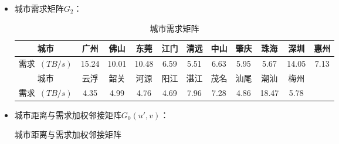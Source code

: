 \documentclass[UTF8,12pt]{ctexart}
\begin{document}
\begin{enumerate}
\begin{itemize}
              \item 城市需求矩阵$G_2$：
                    \begin{table}[htbp]
                        \centering
                        \caption{城市需求矩阵}
                        \begin{tabular}{ccccccccccc}
                            \toprule
                            城市 & 广州  & 佛山  & 东莞  & 江门 & 清远 & 中山 & 肇庆 & 珠海  & 深圳  & 惠州 \\
                            \midrule
                            需求\, $(TB/s)$ & 15.24 & 10.01 & 10.48 & 6.59 & 5.51 & 6.63 & 5.95 & 5.67  & 14.05 & 7.13 \\
                            \midrule
                            城市 & 云浮  & 韶关  & 河源  & 阳江 & 湛江 & 茂名 & 汕尾 & 潮汕  & 梅州  &      \\
                            \midrule
                            需求\, $(TB/s)$ & 4.35  & 4.99  & 4.76  & 4.69 & 7.96 & 7.28 & 4.86 & 18.47 & 5.78  &      \\
                            \bottomrule
                        \end{tabular}%
                    \end{table}%

              \item 城市距离与需求加权邻接矩阵$G_{0}(u',v)$：
                    \begin{table}[H]
                        \caption{城市距离与需求加权邻接矩阵}
                        \makebox[35em][c]{
                            \begin{tiny}


\end{tiny}}
\end{table}
\end{itemize}
\end{enumerate}
\end{document}
